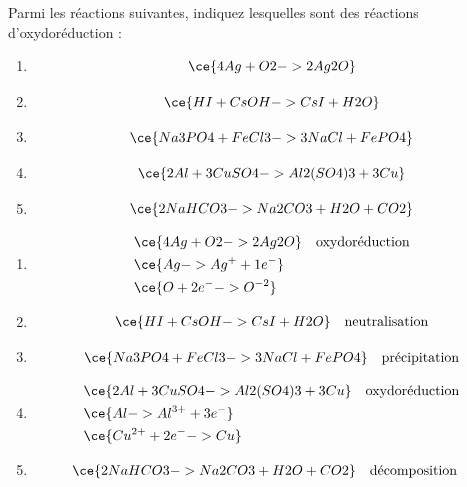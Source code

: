 \documentclass[
  11pt,
  french,
  a4paper,
  openany]{book}
\providecommand{\tightlist}{%
  \setlength{\itemsep}{0pt}\setlength{\parskip}{0pt}}
\begin{document}
\begin{Exercise}

Parmi les réactions suivantes, indiquez lesquelles sont des réactions d'oxydoréduction :

\begin{enumerate}
\def\labelenumi{\alph{enumi}.}
\tightlist
\item
  \[
  \ce{4 Ag + O2 -> 2 Ag2O}
  \]
\item
  \[
  \ce{HI + CsOH -> CsI + H2O}
  \]
\item
  \[
  \ce{Na3PO4 + FeCl3 -> 3 NaCl + FePO4}
  \]
\item
  \[
  \ce{2 Al + 3 CuSO4 -> Al2(SO4)3 + 3 Cu}
  \]
\item
  \[
  \ce{2 NaHCO3 -> Na2CO3 + H2O + CO2}
  \]
\end{enumerate}


\end{Exercise}

\begin{Answer}

\begin{enumerate}
\def\labelenumi{\alph{enumi}.}
\tightlist
\item
  \[
  \begin{split}
  & \ce{4 Ag + O2 -> 2 Ag2O} \quad \text{oxydoréduction} \\
  & \ce{Ag -> Ag^+ + 1e^-} \\
  & \ce{O + 2e^- -> O^{-2}}
  \end{split}
  \]
\item
  \[
  \begin{split}
  \ce{HI + CsOH -> CsI + H2O} \quad \text{neutralisation}
  \end{split}
  \]
\item
  \[
  \begin{split}
  \ce{Na3PO4 + FeCl3 -> 3 NaCl + FePO4} \quad \text{précipitation}
  \end{split}
  \]
\item
  \[
  \begin{split}
  & \ce{2 Al + 3 CuSO4 -> Al2(SO4)3 + 3 Cu} \quad \text{oxydoréduction} \\
  & \ce{Al -> Al^{3+} + 3e^-} \\
  & \ce{Cu^{2+} + 2e^- -> Cu}
  \end{split}
  \]
\item
  \[
  \begin{split}
  & \ce{2 NaHCO3 -> Na2CO3 + H2O + CO2} \quad \text{décomposition}
  \end{split}
  \]
\end{enumerate}


\end{Answer}
\end{document}
